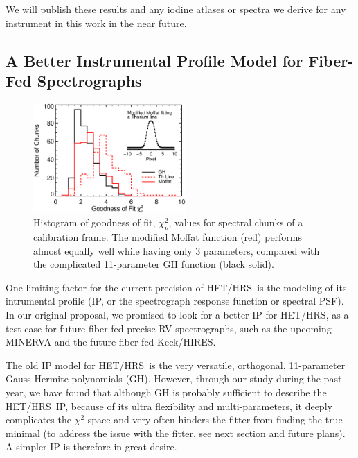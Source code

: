 \documentclass[12pt]{article}
\def\hrs{HET/HRS}
\begin{document}
We will publish these results and any iodine atlases or spectra we
derive for any instrument in this work in the near future.


\vspace{-10pt}
\subsection{A Better Instrumental Profile Model for Fiber-Fed Spectrographs}\label{sec:ip}
\vspace{-5pt}

\begin{figure}
  \vspace{-35pt}
  \begin{center}
    \includegraphics[width=0.52\textwidth]{thar_vs_moffat}
  \end{center}
  \vspace{-25pt}  
  \caption{Histogram of goodness of fit, $\chi_\nu^2$, values for
    spectral chunks of a calibration frame. The modified Moffat
    function (red) performs almost equally well while having only 3
    parameters, compared with the complicated 11-parameter GH function
    (black solid).} 
  \vspace{-8pt}  
  \label{fig:ip}
\end{figure}

One limiting factor for the current precision of \hrs\ is the modeling
of its intrumental profile (IP, or the spectrograph response function
or spectral PSF). In our original proposal, we promised to look for a
better IP for \hrs, as a test case for future fiber-fed precise RV
spectrographs, such as the upcoming MINERVA and the future fiber-fed
Keck/HIRES.

The old IP model for \hrs\ is the very versatile, orthogonal,
11-parameter Gauss-Hermite polynomials (GH). However, through our
study during the past year, we have found that although GH is probably
sufficient to describe the \hrs\ IP, because of its ultra flexibility
and multi-parameters, it deeply complicates the $\chi^2$ space and
very often hinders the fitter from finding the true minimal (to
address the issue with the fitter, see next section and future
plans). A simpler IP is therefore in great desire.
\end{document}
